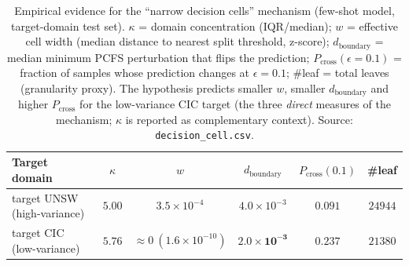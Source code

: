 \documentclass[preprint,12pt,authoryear]{elsarticle}
\begin{document}
\begin{table}[h]
\centering
\caption{Empirical evidence for the ``narrow decision cells'' mechanism (few-shot
model, target-domain test set). $\kappa$ = domain concentration (IQR/median);
$w$ = effective cell width (median distance to nearest split threshold, z-score);
$d_{\text{boundary}}$ = median minimum PCFS perturbation that flips the prediction;
$P_{\text{cross}}(\epsilon{=}0.1)$ = fraction of samples whose prediction changes at
$\epsilon{=}0.1$; \#leaf = total leaves (granularity proxy). The hypothesis predicts
smaller $w$, smaller $d_{\text{boundary}}$ and higher $P_{\text{cross}}$ for the low-variance CIC target (the three \emph{direct} measures of the mechanism; $\kappa$ is reported as complementary context). Source:
\texttt{decision\_cell.csv}.}
\label{tab:decisioncell}
\small
\begin{tabular}{lccccc}
\toprule
Target domain & $\kappa$ & $w$ & $d_{\text{boundary}}$ & $P_{\text{cross}}(0.1)$ & \#leaf \\
\midrule
target UNSW (high-variance) & $5.00$ & $3.5\times10^{-4}$ & $4.0\times10^{-3}$ & $0.091$ & $24944$ \\
target CIC (low-variance)   & $5.76$ & $\approx\!0\ (1.6\times10^{-10})$ & $\mathbf{2.0\times10^{-3}}$ & $\mathbf{0.237}$ & $21380$ \\
\bottomrule
\end{tabular}
\end{table}
\end{document}
